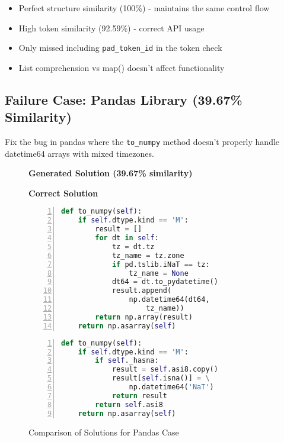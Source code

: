 \documentclass{article}
\begin{document}
\begin{tcolorbox}[colback=LightGreen!10,title=Success Analysis]
\begin{itemize}
\item Perfect structure similarity (100\%) - maintains the same control flow
\item High token similarity (92.59\%) - correct API usage
\item Only missed including \texttt{pad\_token\_id} in the token check
\item List comprehension vs map() doesn't affect functionality
\end{itemize}
\end{tcolorbox}

\subsection{Failure Case: Pandas Library (39.67\% Similarity)}

\begin{tcolorbox}[colback=LightRed!10,title=Problem Description]
Fix the bug in pandas where the \texttt{to\_numpy} method doesn't properly handle datetime64 arrays with mixed timezones.
\end{tcolorbox}

\begin{figure}[htbp]
\begin{center}
\begin{minipage}{0.48\textwidth}
\centering
\textbf{Generated Solution (39.67\% similarity)}
\end{minipage}%
\hfill%
\begin{minipage}{0.48\textwidth}
\centering
\textbf{Correct Solution}
\end{minipage}

\vspace{0.5em}

\begin{minipage}{0.48\textwidth}
\begin{lstlisting}[language=Python,numbers=left]
def to_numpy(self):
    if self.dtype.kind == 'M':
        result = []
        for dt in self:
            tz = dt.tz
            tz_name = tz.zone
            if pd.tslib.iNaT == tz:
                tz_name = None
            dt64 = dt.to_pydatetime()
            result.append(
                np.datetime64(dt64, 
                    tz_name))
        return np.array(result)
    return np.asarray(self)
\end{lstlisting}
\end{minipage}%
\hfill%
\begin{minipage}{0.48\textwidth}
\begin{lstlisting}[language=Python,numbers=left]
def to_numpy(self):
    if self.dtype.kind == 'M':
        if self._hasna:
            result = self.asi8.copy()
            result[self.isna()] = \
                np.datetime64('NaT')
            return result
        return self.asi8
    return np.asarray(self)
\end{lstlisting}
\end{minipage}
\end{center}
\caption{Comparison of Solutions for Pandas Case}
\end{figure}
\end{document}
